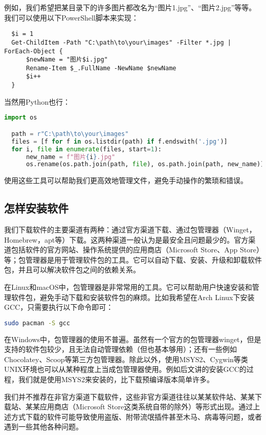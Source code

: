 例如，我们希望把某目录下的许多图片都改名为“图片1.jpg”、“图片2.jpg”等等。我们可以使用以下PowerShell脚本来实现：
\begin{lstlisting}
  $i = 1
  Get-ChildItem -Path "C:\path\to\your\images" -Filter *.jpg | ForEach-Object {
      $newName = "图片$i.jpg"
      Rename-Item $_.FullName -NewName $newName
      $i++
  }
\end{lstlisting}
当然用Python也行：
\begin{lstlisting}[language=python]
  import os

  path = r"C:\path\to\your\images"
  files = [f for f in os.listdir(path) if f.endswith('.jpg')]
  for i, file in enumerate(files, start=1):
      new_name = f"图片{i}.jpg"
      os.rename(os.path.join(path, file), os.path.join(path, new_name))
\end{lstlisting}
使用这些工具可以帮助我们更高效地管理文件，避免手动操作的繁琐和错误。

\subsection{怎样安装软件}

我们下载软件的主要渠道有两种：通过官方渠道下载、通过包管理器（Winget，Homebrew，apt等）下载。这两种渠道一般认为是最安全且问题最少的。官方渠道包括软件的官方网站、操作系统提供的应用商店（Microsoft Store、App Store）等；包管理器是用于管理软件包的工具。它可以自动下载、安装、升级和卸载软件包，并且可以解决软件包之间的依赖关系。

在Linux和macOS中，包管理器是非常常用的工具。它可以帮助用户快速安装和管理软件包，避免手动下载和安装软件包的麻烦。比如我希望在Arch Linux下安装GCC，只需要执行以下命令即可：

\begin{lstlisting}[language=bash]
    sudo pacman -S gcc
\end{lstlisting}

在Windows中，包管理器的使用不普遍。虽然有一个官方的包管理器winget，但是支持的软件包较少，且无法自动管理依赖（但也基本够用）；还有一些例如Chocolatey、Scoop等第三方包管理器。除此以外，使用MSYS2、Cygwin等类UNIX环境也可以从某种程度上当成包管理器使用。例如后文讲的安装GCC的过程，我们就是使用MSYS2来安装的，比下载预编译版本简单许多。

我们并不推荐在非官方渠道下载软件，这些非官方渠道往往以某某软件站、某某下载站、某某应用商店（Microsoft Store这类系统自带的除外）等形式出现。通过上述方式下载的软件可能导致使用盗版、附带流氓插件甚至木马、病毒等问题，或者遇到一些其他各种问题。

